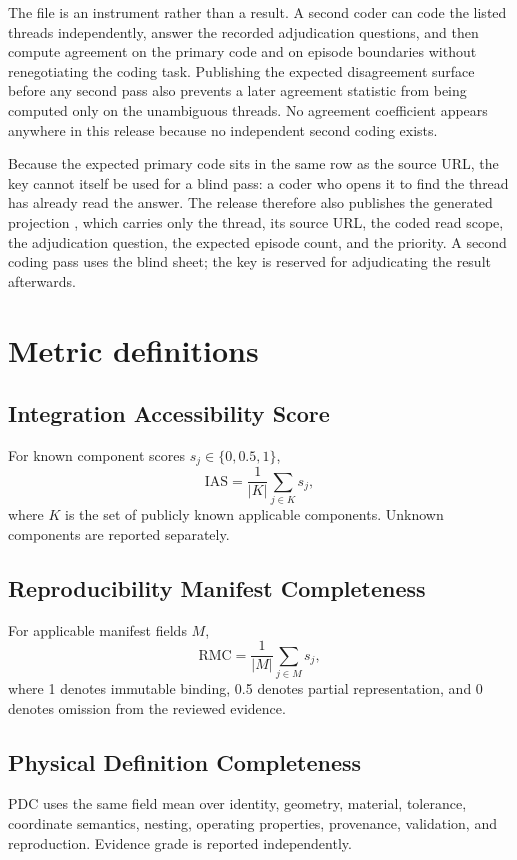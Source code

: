 \documentclass[preprint,12pt]{elsarticle}
\begin{document}
The file is an instrument rather than a result. A second coder can code the listed threads independently, answer the recorded adjudication questions, and then compute agreement on the primary code and on episode boundaries without renegotiating the coding task. Publishing the expected disagreement surface before any second pass also prevents a later agreement statistic from being computed only on the unambiguous threads. No agreement coefficient appears anywhere in this release because no independent second coding exists.

Because the expected primary code sits in the same row as the source URL, the key cannot itself be used for a blind pass: a coder who opens it to find the thread has already read the answer. The release therefore also publishes the generated projection , which carries only the thread, its source URL, the coded read scope, the adjudication question, the expected episode count, and the priority. A second coding pass uses the blind sheet; the key is reserved for adjudicating the result afterwards.

\section{Metric definitions}
\subsection{Integration Accessibility Score}
For known component scores $s_j\in\{0,0.5,1\}$,
\[
  \mathrm{IAS}=\frac{1}{|K|}\sum_{j\in K}s_j,
\]
where $K$ is the set of publicly known applicable components. Unknown components are reported separately.

\subsection{Reproducibility Manifest Completeness}
For applicable manifest fields $M$,
\[
  \mathrm{RMC}=\frac{1}{|M|}\sum_{j\in M}s_j,
\]
where 1 denotes immutable binding, 0.5 denotes partial representation, and 0 denotes omission from the reviewed evidence.

\subsection{Physical Definition Completeness}
PDC uses the same field mean over identity, geometry, material, tolerance, coordinate semantics, nesting, operating properties, provenance, validation, and reproduction. Evidence grade is reported independently.
\end{document}
